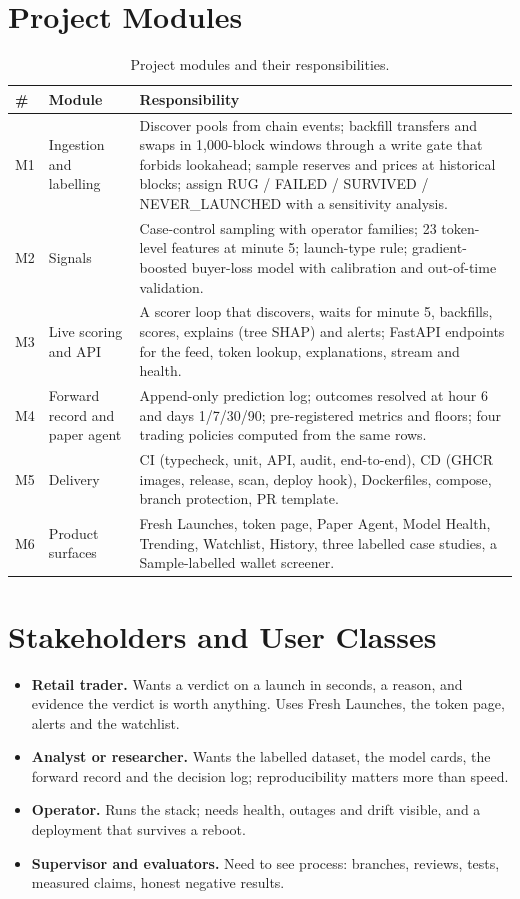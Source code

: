 \section{Project Modules}
\begin{table}[H]
\centering\small
\begin{tabular}{p{}p{}p{}}
\toprule
\# & Module & Responsibility\\
\midrule
M1 & Ingestion and labelling & Discover pools from chain events; backfill transfers and swaps in 1,000-block windows through a write gate that forbids lookahead; sample reserves and prices at historical blocks; assign RUG / FAILED / SURVIVED / NEVER\_LAUNCHED with a sensitivity analysis.\\
M2 & Signals & Case-control sampling with operator families; 23 token-level features at minute 5; launch-type rule; gradient-boosted buyer-loss model with calibration and out-of-time validation.\\
M3 & Live scoring and API & A scorer loop that discovers, waits for minute 5, backfills, scores, explains (tree SHAP) and alerts; FastAPI endpoints for the feed, token lookup, explanations, stream and health.\\
M4 & Forward record and paper agent & Append-only prediction log; outcomes resolved at hour 6 and days 1/7/30/90; pre-registered metrics and floors; four trading policies computed from the same rows.\\
M5 & Delivery & CI (typecheck, unit, API, audit, end-to-end), CD (GHCR images, release, scan, deploy hook), Dockerfiles, compose, branch protection, PR template.\\
M6 & Product surfaces & Fresh Launches, token page, Paper Agent, Model Health, Trending, Watchlist, History, three labelled case studies, a Sample-labelled wallet screener.\\
\bottomrule
\end{tabular}
\caption{Project modules and their responsibilities.}
\end{table}

\section{Stakeholders and User Classes}
\begin{itemize}
  \item \textbf{Retail trader.} Wants a verdict on a launch in seconds, a reason, and evidence the verdict is worth anything. Uses Fresh Launches, the token page, alerts and the watchlist.
  \item \textbf{Analyst or researcher.} Wants the labelled dataset, the model cards, the forward record and the decision log; reproducibility matters more than speed.
  \item \textbf{Operator.} Runs the stack; needs health, outages and drift visible, and a deployment that survives a reboot.
  \item \textbf{Supervisor and evaluators.} Need to see process: branches, reviews, tests, measured claims, honest negative results.
\end{itemize}

